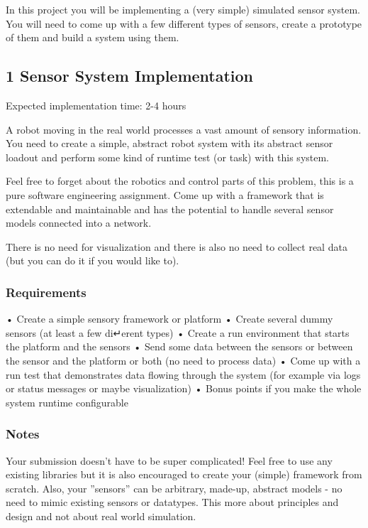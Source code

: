 In this project you will be implementing a (very simple) simulated sensor system. You will need to come up with a few different types of sensors, create a prototype of them and build a system using them.

\subsection*{1 Sensor System Implementation}

Expected implementation time\+: 2-\/4 hours

A robot moving in the real world processes a vast amount of sensory information. You need to create a simple, abstract robot system with its abstract sensor loadout and perform some kind of runtime test (or task) with this system.

Feel free to forget about the robotics and control parts of this problem, this is a pure software engineering assignment. Come up with a framework that is extendable and maintainable and has the potential to handle several sensor models connected into a network.

There is no need for visualization and there is also no need to collect real data (but you can do it if you would like to).

\subsubsection*{Requirements}

\begin{DoxyVerb}• Create a simple sensory framework or platform
• Create several dummy sensors (at least a few di↵erent types)
• Create a run environment that starts the platform and the sensors
• Send some data between the sensors or between the sensor and the platform or both
(no need to process data)
• Come up with a run test that demonstrates data flowing through the system (for
example via logs or status messages or maybe visualization)
• Bonus points if you make the whole system runtime configurable
\end{DoxyVerb}


\subsubsection*{Notes}

Your submission doesn’t have to be super complicated! Feel free to use any existing libraries but it is also encouraged to create your (simple) framework from scratch. Also, your ”sensors” can be arbitrary, made-\/up, abstract models -\/ no need to mimic existing sensors or datatypes. This more about principles and design and not about real world simulation.

